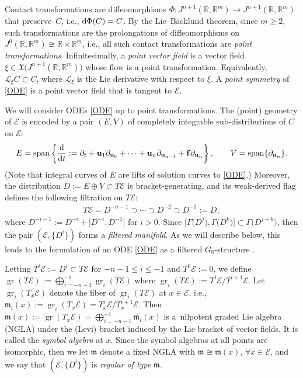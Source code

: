 \documentclass[10pt,a4paper]{amsart}
\DeclareMathOperator{\gr}{gr}
\DeclareMathOperator{\sn}{span}
\newcommand\cL{\mathcal{L}}
\renewcommand\gr{\operatorname{gr}}
\newcommand\fm {\mathfrak{m}}
\newcommand{\R}{\mathbb{R}}
\newcommand\cE{\mathcal{E}}
\numberwithin{equation}{section}
\begin{document}
 Contact transformations are diffeomorphisms $\Phi\colon J^{n+1}(\R, \R^m) \to J^{n+1}(\R, \R^m)$ that preserve~$C$, i.e., ${\rm d}\Phi(C) = C$. By the Lie--B\"{a}cklund theorem, since $m \ge 2$, such transformations are the prolongations of diffeomorphisms on $J^0(\R, \R^m) \cong \R \times \R^m$, i.e., all such contact transformations are {\em point transformations}. Infinitesimally, a {\em point vector field} is a vector field $\xi \in \mathfrak{X}\bigl(J^{n+1}(\R,\R^m)\bigr)$ whose flow is a point transformation. Equivalently, $\cL_\xi C \subset C$, where $\cL_\xi$ is the Lie derivative with respect to $\xi$. A {\em point symmetry} of \eqref{ODE} is a point vector field that is tangent to $\cE$.

 We will consider ODEs \eqref{ODE} up to point transformations. The (point) geometry of $\cE$ is encoded by a pair $(E , V)$ of completely integrable sub-distributions of $C$ on $\cE$:
\begin{align} \label{E:EV}
E = \sn \left\{ \frac{\rm d}{{\rm d}t}:=\partial_t + \mathbf{u}_1\partial_{\mathbf{u}_0} + \cdots + \mathbf{u}_{n}\partial_{\mathbf{u}_{n-1}} + \mathbf{f}\partial_{\mathbf{u}_{n}}\right\}, \qquad
V= \sn \{\partial_{\mathbf{u}_n} \}.
\end{align}
(Note that integral curves of $E$ are lifts of solution curves to \eqref{ODE}.) Moreover, the distribution $D := E \oplus V \subset T\mathcal{E}$ is bracket-generating, and its weak-derived flag defines the following filtration on $T\cE$:
 \begin{align*}%
 T\mathcal{E} = D^{-n-1} \supset \cdots \supset D^{-2} \supset D^{-1} := D,
 \end{align*}
 where $D^{-i-1} := D^{-i} + \big[D^{-i}, D^{-1}\big]$
for $i > 0$. Since $\big[\Gamma\bigl(D^j\bigr), \Gamma\bigl(D^k\bigr)\big] \subset \Gamma\bigl(D^{j+k}\bigr)$, then the pair $(\mathcal{E}, \{D^i\})$ forms a {\em filtered manifold}.
As we will describe below, this leads to the formulation of an ODE \eqref{ODE} as a filtered $G_0$-structure \cite[Section~2.1]{Andreas2017}.

Letting $T^i\cE := D^i \subset T\cE$ for $-n-1 \le i \le -1$ and $T^0\cE := 0$, we define
$\gr(T \mathcal{E}) := \bigoplus^{-1}_{i=-n-1} \gr_i(T\mathcal{E})$ where $\gr_i(T\mathcal{E}) := T^i\cE / T^{i+1}\cE$. Let $\gr_i(T_x\cE)$ denote the fiber of $\gr_i(T\cE)$ at $x \in \cE$, i.e., $\fm_i(x):=\gr_i(T_x\cE)= T^i_x\cE / T^{i+1}_x\cE$. Then $\fm (x):=\gr(T_x \cE )= \bigoplus^{-1}_{i=-n-1}\fm_i(x)$ is a~nilpotent graded Lie algebra (NGLA) under the (Levi) bracket induced by the Lie bracket of vector fields. It is called the {\em symbol algebra} at $x$. Since the symbol algebras at all points are isomorphic, then we let $\fm$ denote a fixed NGLA with $\mathfrak{m} \cong \fm (x)$, $\forall x \in \cE$, and we say that $(\cE, \{D^i\})$ is {\em regular of type} $\fm$.
\end{document}
